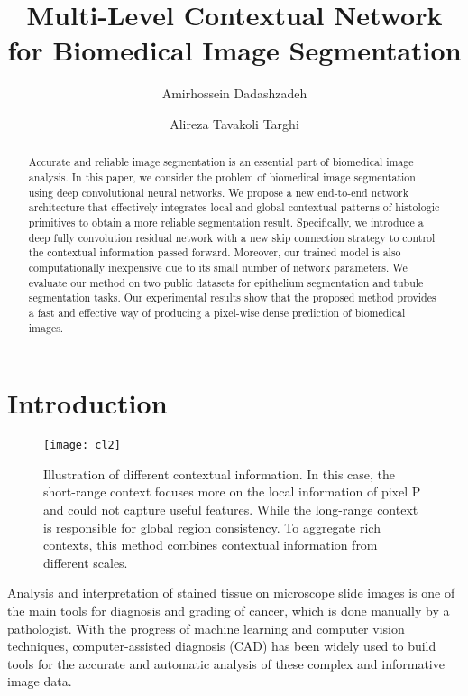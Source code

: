\documentclass[10pt,twocolumn]{article}
\begin{document}
\title{Multi-Level Contextual Network for Biomedical Image Segmentation}

\author{ Amirhossein Dadashzadeh }
\author{ Alireza Tavakoli Targhi}


\maketitle
\thispagestyle{empty}

\begin{abstract}
Accurate and reliable image segmentation is an essential part of biomedical image analysis. In this paper, we consider the problem of biomedical image segmentation
using deep convolutional neural networks. We propose a new end-to-end network architecture that effectively integrates local and global contextual patterns of histologic primitives to obtain a more reliable segmentation result. Specifically, we introduce a deep fully convolution residual network with a new skip connection strategy to control the contextual information passed forward.
 Moreover, our trained model is also computationally inexpensive due to its small number of network parameters.
We evaluate our method on two public datasets for epithelium segmentation and tubule segmentation tasks.
Our experimental results show that the proposed method provides a fast and effective way of producing a pixel-wise dense prediction of biomedical images.
\end{abstract}


\section{Introduction} \label{intro}
\begin{figure}[t]

\centering
\texttt{[image: cl2]}
\caption{Illustration of different contextual information. In this case, the short-range context focuses more on the local information of pixel P and could not capture useful features. While the long-range context is responsible for global region consistency. To aggregate rich contexts, this method combines contextual information from different scales.
}
\label{f1}
\end{figure}
Analysis and interpretation of stained tissue on microscope slide images is one of the main tools for diagnosis and grading of cancer, which is done manually by a pathologist.
With the progress of machine learning and computer vision techniques, computer-assisted diagnosis (CAD) has been widely used to build tools for the accurate and automatic analysis of these complex and informative image data.
\end{document}
